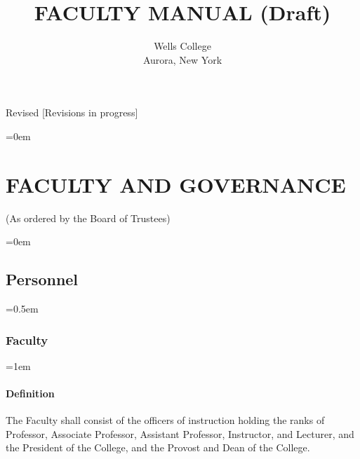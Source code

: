 \documentclass{manual}
\let\stdsection\section %
\renewcommand\section{\newpage\stdsection}
\let\oldsection\section
\renewcommand\section{\leftskip=0em\oldsection}
\let\oldsubsection\subsection
\renewcommand\subsection{\leftskip=0em\oldsubsection}
\let\oldsubsubsection\subsubsection
\renewcommand\subsubsection{\leftskip=0.5em\oldsubsubsection}
\let\oldparagraph\paragraph
\renewcommand\paragraph{\leftskip=1em\oldparagraph}
\begin{document}
\title{FACULTY MANUAL (Draft)}
\author{Wells College\\Aurora, New York}

\maketitle
  \vfill
  \begin{center}
  Revised [Revisions in progress]
  \end{center}

\newpage

\pagestyle{fancy}
\fancyhead[R]{\thepage \addtocounter{articlePage}{1}}

\tableofcontents
\newpage

\fancyfoot[C]{\thesection-\thearticlePage}

\section{FACULTY AND GOVERNANCE}\label{art:FacultyAndGovernance}
\begin{center}(As ordered by the Board of Trustees)\end{center}

\subsection{Personnel}\label{sec:Personnel}

\subsubsection{Faculty}\label{sub:Faculty}

\paragraph{Definition}
The Faculty shall consist of the officers of instruction holding the ranks of Professor, Associate Professor, Assistant Professor, Instructor, and Lecturer, and the President of the College, and the Provost and Dean of the College.

\end{document}
